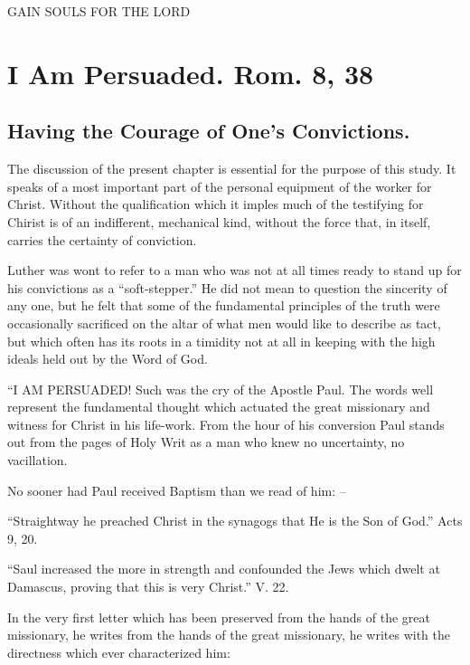 \documentclass[
]{book}
\begin{document}
\begin{center} GAIN SOULS FOR THE LORD \end{center}

\hypertarget{i-am-persuaded.-rom.-8-38}{%
\chapter{I Am Persuaded. Rom. 8, 38}\label{i-am-persuaded.-rom.-8-38}}

\hypertarget{having-the-courage-of-ones-convictions.}{%
\section*{Having the Courage of One's Convictions.}\label{having-the-courage-of-ones-convictions.}}

The discussion of the present chapter is essential for the purpose of this study. It speaks of a most important part of the personal equipment of the worker for Christ. Without the qualification which it imples much of the testifying for Chirist is of an indifferent, mechanical kind, without the force that, in itself, carries the certainty of conviction.

Luther was wont to refer to a man who was not at all times ready to stand up for his convictions as a ``soft-stepper.'' He did not mean to question the sincerity of any one, but he felt that some of the fundamental principles of the truth were occasionally sacrificed on the altar of what men would like to describe as tact, but which often has its roots in a timidity not at all in keeping with the high ideals held out by the Word of God.

``I AM PERSUADED! Such was the cry of the Apostle Paul. The words well represent the fundamental thought which actuated the great missionary and witness for Christ in his life-work. From the hour of his conversion Paul stands out from the pages of Holy Writ as a man who knew no uncertainty, no vacillation.

No sooner had Paul received Baptism than we read of him: --

``Straightway he preached Christ in the synagogs that He is the Son of God.'' Acts 9, 20.

``Saul increased the more in strength and confounded the Jews which dwelt at Damascus, proving that this is very Christ.'' V. 22.

In the very first letter which has been preserved from the hands of the great missionary, he writes from the hands of the great missionary, he writes with the directness which ever characterized him:
\end{document}
